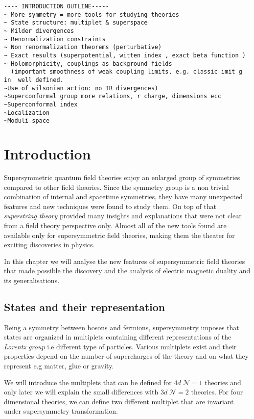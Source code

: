 \begin{lstlisting}
---- INTRODUCTION OUTLINE-----
~ More symmetry = more tools for studying theories
~ State structure: multiplet & superspace
~ Milder divergences 
~ Renormalization constraints
~ Non renormalization theorems (perturbative)
~ Exact results (superpotential, witten index , exact beta function )
~ Holomorphicity, couplings as background fields 
  (important smoothness of weak coupling limits, e.g. classic imit g in  well defined.
~Use of wilsonian action: no IR divergences)
~Superconformal group more relations, r charge, dimensions ecc
~Superconformal index
~Localization
~Moduli space
\end{lstlisting}

\section{Introduction}
Supersymmetric quantum field theories enjoy an enlarged group of  symmetries compared to other field theories. 
Since the symmetry group is a non trivial combination of internal and spacetime symmetries, they have many unexpected features and new techniques were found to study them.
On top of that \emph{superstring theory} provided many insights and explanations that were not clear from a field theory perspective only. 
Almost all of the new tools found are available only for supersymmetric field theories, making them the theater for exciting discoveries in physics.

In this chapter we will analyse the new features of supersymmetric field theories that made possible the discovery and the analysis of electric magnetic duality and its generalisations.

\subsection{ States and their representation}

Being a symmetry between bosons and fermions, supersymmetry imposes that states are organized in multiplets containing different representations of the \emph{Lorentz group} i.e different type of  particles.
Various multiplets exist and their properties depend on the number of supercharges of the theory and on what they represent e.g matter, glue or gravity. 

We will introduce the multiplets that can be defined for $4d \; \mathcal{N} = 1$ theories and only later we will explain the small differences with $3d \; \mathcal{N} = 2$ theories.
For four dimensional theories, we can define two different multiplet that are invariant under supersymmetry transformation.

